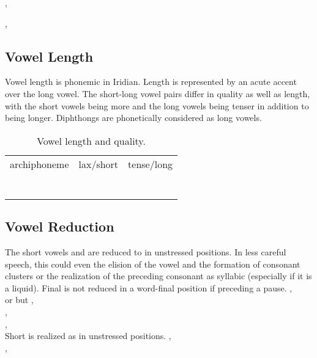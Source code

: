 \ex
{}, \\
\xe

\ex
{}, \\
\xe

\subsection{Vowel Length}

Vowel length is phonemic in Iridian. Length is represented by an acute accent over the long vowel. The short-long vowel pairs differ in quality as well as length, with the short vowels being more and the long vowels being tenser in addition to being longer. Diphthongs are phonetically considered as long vowels.

\begin{table}[h!]
	\small\centering
	\caption{Vowel length and quality.}
	\begin{tabu} to 0.7 \textwidth{MMM}
		\toprule \addlinespace
		{\sc archiphoneme} & {\sc lax/short} &{\sc tense/long}\\ \addlinespace\midrule
		\addlinespace
			& 	& 		\\\addlinespace
			& 	& 		\\\addlinespace
			& 	& 		\\\addlinespace
			& 	& 		\\\addlinespace
			& 	& 		\\\addlinespace
			& 	& 		\\\addlinespace
		\bottomrule		
	\end{tabu} 
\end{table}

\subsection{Vowel Reduction}
The short vowels  and  are reduced to  in unstressed positions. In less careful speech, this could even the elision of the vowel and the formation of consonant clusters or the realization of the preceding consonant as syllabic (especially if it is a liquid). Final  is not reduced in a word-final position if preceding a pause.  
\pex
	\a
	, \\
	 or 
	\a
	but , \\
\xe
\ex {}, \\
\xe
\ex {}, \\
\xe
Short  is realized as  in unstressed positions.
\ex {}, \\
\xe
\ex {}, \\
\xe


